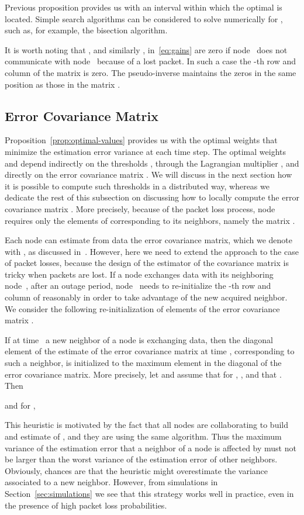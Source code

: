 \documentclass[a4paper,notitlepage,onecolumn]{article}
\numberwithin{equation}{section}
\begin{document}
Previous proposition provides us with an interval within which the
optimal  is located. Simple search algorithms can be
considered to solve numerically  for
, such as, for example, the bisection algorithm.

It is worth noting that , and similarly ,
in~\eqref{eq:gains} are zero if node~ does not communicate with
node~ because of a lost packet. In such a case the -th
row and column of the matrix  is
zero. The pseudo-inverse  maintains the zeros in the
same position as those in the matrix
.

\subsection{Error Covariance Matrix}

Proposition~\ref{prop:optimal-values} provides us with the optimal
weights that minimize the estimation error variance at each time
step. The optimal weights  and  depend
indirectly on the thresholds , through the Lagrangian
multiplier , and directly on the error covariance
matrix . We will discuss in the next section how it is
possible to compute such thresholds  in a distributed
way, whereas we dedicate the rest of this subsection on discussing
how to locally compute the error covariance matrix .
More precisely, because of the packet loss process, node~
requires only the elements of  corresponding to its
neighbors, namely the matrix .

Each node can estimate from data the error covariance matrix,
which we denote with , as discussed
in~\cite{JSAC07}. However, here we need to extend the approach to
the case of packet losses, because the design of the estimator of
the covariance matrix is tricky when packets are lost. If a node
 exchanges data with its neighboring node~, after an outage
period, node~ needs to re-initialize the -th row and column
of  reasonably in order to take advantage of
the new acquired neighbor. We consider the following
re-initialization of elements of the error covariance matrix
.

If at time~ a new neighbor of a node is exchanging data, then
the diagonal element of the estimate of the error covariance
matrix at time , corresponding to such a neighbor, is
initialized to the maximum element in the diagonal of the error
covariance matrix. More precisely, let   and
assume that for , , and that . Then

and for ,

This heuristic is motivated by the fact that all nodes are
collaborating to build and estimate of , and they are using
the same algorithm. Thus the maximum variance of the estimation
error that a neighbor of a node is affected by must not be larger
than the worst variance of the estimation error of other
neighbors. Obviously, chances are that the heuristic might
overestimate the variance associated to a new neighbor. However,
from simulations in Section~\ref{sec:simulations} we see that this
strategy works well in practice, even in the presence of high packet loss
probabilities.
\end{document}
